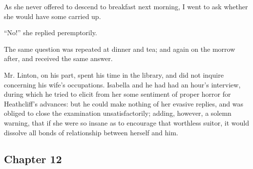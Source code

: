 \par As she never offered to descend to breakfast next morning, I went to ask whether she would have some carried up.
\par “No!” she replied peremptorily.
\par The same question was repeated at dinner and tea; and again on the morrow after, and received the same answer.
\par Mr. Linton, on his part, spent his time in the library, and did not inquire concerning his wife's occupations. Isabella and he had had an hour's interview, during which he tried to elicit from her some sentiment of proper horror for Heathcliff's advances: but he could make nothing of her evasive replies, and was obliged to close the examination unsatisfactorily; adding, however, a solemn warning, that if she were so insane as to encourage that worthless suitor, it would dissolve all bonds of relationship between herself and him.









\subsection*{Chapter 12}

